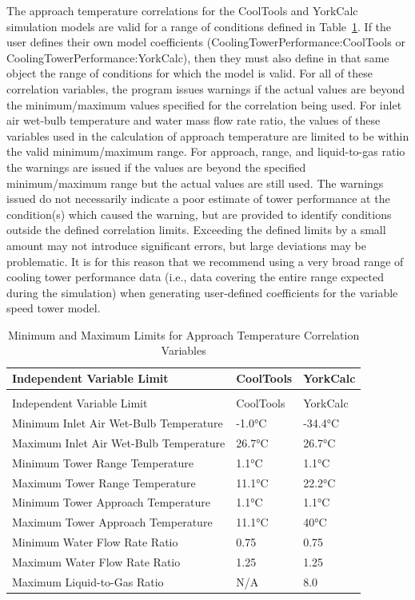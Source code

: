 The approach temperature correlations for the CoolTools and YorkCalc simulation models are valid for a range of conditions defined in Table~\ref{table:minimum-and-maximum-limits-for-approach}. If the user defines their own model coefficients (CoolingTowerPerformance:CoolTools or CoolingTowerPerformance:YorkCalc), then they must also define in that same object the range of conditions for which the model is valid. For all of these correlation variables, the program issues warnings if the actual values are beyond the minimum/maximum values specified for the correlation being used. For inlet air wet-bulb temperature and water mass flow rate ratio, the values of these variables used in the calculation of approach temperature are limited to be within the valid minimum/maximum range. For approach, range, and liquid-to-gas ratio the warnings are issued if the values are beyond the specified minimum/maximum range but the actual values are still used. The warnings issued do not necessarily indicate a poor estimate of tower performance at the condition(s) which caused the warning, but are provided to identify conditions outside the defined correlation limits. Exceeding the defined limits by a small amount may not introduce significant errors, but large deviations may be problematic. It is for this reason that we recommend using a very broad range of cooling tower performance data (i.e., data covering the entire range expected during the simulation) when generating user-defined coefficients for the variable speed tower model.

\begin{longtable}[c]{@{}lll@{}}
\caption{Minimum and Maximum Limits for Approach Temperature Correlation Variables \label{table:minimum-and-maximum-limits-for-approach}} \tabularnewline
\toprule 
Independent Variable Limit & CoolTools & YorkCalc \tabularnewline
\midrule
\endfirsthead

\caption[]{Minimum and Maximum Limits for Approach Temperature Correlation Variables} \tabularnewline
\toprule 
Independent Variable Limit & CoolTools & YorkCalc \tabularnewline
\midrule
\endhead

Minimum Inlet Air Wet-Bulb Temperature & -1.0°C & -34.4°C \tabularnewline
Maximum Inlet Air Wet-Bulb Temperature & 26.7°C & 26.7°C \tabularnewline
Minimum Tower Range Temperature & 1.1°C & 1.1°C \tabularnewline
Maximum Tower Range Temperature & 11.1°C & 22.2°C \tabularnewline
Minimum Tower Approach Temperature & 1.1°C & 1.1°C \tabularnewline
Maximum Tower Approach Temperature & 11.1°C & 40°C \tabularnewline
Minimum Water Flow Rate Ratio & 0.75 & 0.75 \tabularnewline
Maximum Water Flow Rate Ratio & 1.25 & 1.25 \tabularnewline
Maximum Liquid-to-Gas Ratio & N/A & 8.0 \tabularnewline
\bottomrule
\end{longtable}

